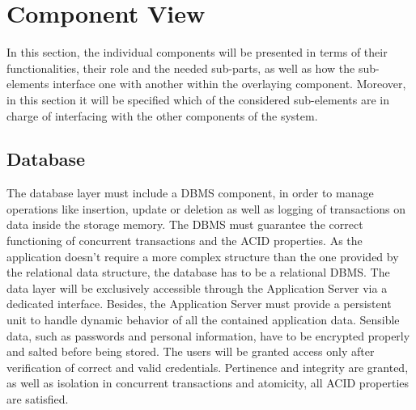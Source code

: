 \section{Component View}
In this section, the individual components will be presented in terms of their functionalities, their role and the 
needed sub-parts, as well as how the sub-elements interface one with another within the overlaying component. Moreover, 
in this section it will be specified which of the considered sub-elements are in charge of interfacing with the other 
components of the system.

\subsection{Database}
The database layer must include a DBMS component, in order to manage operations like insertion, update or deletion as 
well as logging of transactions on data inside the storage memory. The DBMS must guarantee the correct functioning of 
concurrent transactions and the ACID properties. As the application doesn’t require a more complex structure than the 
one provided by the relational data structure, the database has to be a relational DBMS. The data layer will be exclusively 
accessible through the Application Server via a dedicated interface. Besides, the Application Server must provide a 
persistent unit to handle dynamic behavior of all the contained application data. 
\newline Sensible data, such as passwords and personal information, have to be encrypted properly and salted before being stored. 
The users will be granted access only after verification of correct and valid credentials.
\newline Pertinence and integrity are granted, as well as isolation in concurrent transactions and atomicity, all ACID properties 
are satisfied.

